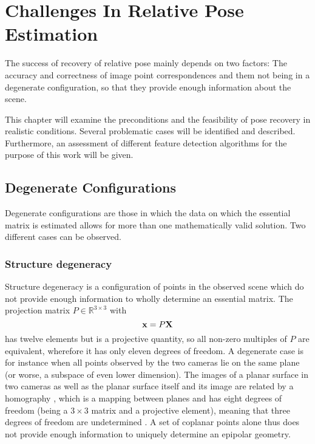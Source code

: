 \chapter{Challenges In Relative Pose Estimation}

The success of recovery of relative pose mainly depends on two factors: The
accuracy and correctness of image point correspondences and them not being in
a degenerate configuration, so that they provide enough information about the
scene.

This chapter will examine the preconditions and the feasibility of pose recovery
in realistic conditions. Several problematic cases will be identified and
described. Furthermore, an assessment of different feature detection algorithms
for the purpose of this work will be given.

\section{Degenerate Configurations}

Degenerate configurations are those in which the data on which the essential
matrix is estimated allows for more than one mathematically valid solution. Two
different cases can be observed.

\subsection{Structure degeneracy}

Structure degeneracy is a configuration of points in the observed scene which do
not provide enough information to wholly determine an essential matrix. The
projection matrix $P\in\mathbb{R}^{3\times3}$ with 
\begin{equation*}
   \mathbf{x} = P\mathbf{X}
\end{equation*}
has twelve elements but is a projective quantity, so all non-zero multiples of
$P$ are equivalent, wherefore it has only eleven degrees of freedom.  A
degenerate case is for instance when all points observed by the two cameras lie
on the same plane (or worse, a subspace of even lower dimension). The images of
a planar surface in two cameras as well as the planar surface itself and its
image are related by a homography \citep[see][ch. 13]{h&z2004}, which is a
mapping between planes and has eight degrees of freedom (being a $3\times3$
matrix and a projective element), meaning that three degrees of freedom are
undetermined \citep{torr1999}. A set of coplanar points alone thus does not provide
enough information to uniquely determine an epipolar geometry.

